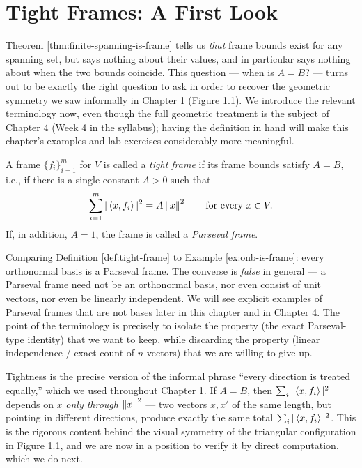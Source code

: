 \section{Tight Frames: A First Look}
\label{sec:tight-frames-preview}

Theorem \ref{thm:finite-spanning-is-frame} tells us \emph{that} frame bounds exist for any spanning set, but says nothing about their values, and in particular says nothing about when the two bounds coincide. This question --- when is $A = B$? --- turns out to be exactly the right question to ask in order to recover the geometric symmetry we saw informally in Chapter 1 (Figure 1.1). We introduce the relevant terminology now, even though the full geometric treatment is the subject of Chapter 4 (Week 4 in the syllabus); having the definition in hand will make this chapter's examples and lab exercises considerably more meaningful.

\begin{definition}
\label{def:tight-frame}
A frame $\{f_i\}_{i=1}^m$ for $V$ is called a \emph{tight frame} if its frame bounds satisfy $A = B$, i.e., if there is a single constant $A > 0$ such that
$$
\sum_{i=1}^m |\left\langle x, f_i \right\rangle|^2 = A \left\| x \right\|^2 \qquad \text{for every } x \in V.
$$
If, in addition, $A = 1$, the frame is called a \emph{Parseval frame}.
\end{definition}

\begin{remark*}
Comparing Definition \ref{def:tight-frame} to Example \ref{ex:onb-is-frame}: every orthonormal basis is a Parseval frame. The converse is \emph{false} in general --- a Parseval frame need not be an orthonormal basis, nor even consist of unit vectors, nor even be linearly independent. We will see explicit examples of Parseval frames that are not bases later in this chapter and in Chapter 4. The point of the terminology is precisely to isolate the property (the exact Parseval-type identity) that we want to keep, while discarding the property (linear independence / exact count of $n$ vectors) that we are willing to give up.
\end{remark*}

\begin{remark*}
Tightness is the precise version of the informal phrase ``every direction is treated equally,'' which we used throughout Chapter 1. If $A = B$, then $\sum_i |\left\langle x, f_i \right\rangle|^2$ depends on $x$ \emph{only through $\left\| x \right\|^2$} --- two vectors $x, x'$ of the same length, but pointing in different directions, produce exactly the same total $\sum_i |\left\langle x, f_i \right\rangle|^2$. This is the rigorous content behind the visual symmetry of the triangular configuration in Figure 1.1, and we are now in a position to verify it by direct computation, which we do next.
\end{remark*}

